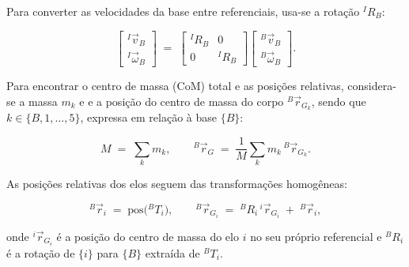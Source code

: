 Para converter as velocidades da base entre referenciais, usa-se a rotação ${}^{I}R_B$:

\begin{equation}
\label{eq:ref_map}
\begin{bmatrix}
{}^{I}\vec v_B \\[2pt]
{}^{I}\vec \omega_B
\end{bmatrix}
\;=\;
\begin{bmatrix}
{}^{I}R_B & 0 \\
0 & {}^{I}R_B
\end{bmatrix}
\begin{bmatrix}
{}^{B}\vec v_B \\[2pt]
{}^{B}\vec \omega_B
\end{bmatrix}.
\end{equation}

Para encontrar o centro de massa (CoM) total e as posições relativas, considera-se a massa $m_k$ e e a posição do centro de massa do corpo ${}^{B}\vec r_{G_k}$, sendo que $k \in \{B,1,\dots,5\}$, expressa em relação à base $\{B\}$:

\begin{equation}
\label{eq:cm_total}
M \;=\; \sum_{k} m_k,
\qquad
{}^{B}\vec r_{G} \;=\; \frac{1}{M}\sum_{k} m_k\,{}^{B}\vec r_{G_k}.
\end{equation}

As posições relativas dos elos seguem das transformações homogêneas:

\begin{equation}
\label{eq:ri_pos}
{}^{B}\vec r_i \;=\; \text{pos}\big({}^{B}T_{i}\big),
\qquad
{}^{B}\vec r_{G_i} \;=\; {}^{B}R_i\,{}^{i}\vec r_{G_i} \;+\; {}^{B}\vec r_i,
\end{equation}

onde ${}^{i}\vec r_{G_i}$ é a posição do centro de massa do elo $i$ no seu próprio referencial e ${}^{B}R_i$ é a rotação de $\{i\}$ para $\{B\}$ extraída de ${}^{B}T_i$.